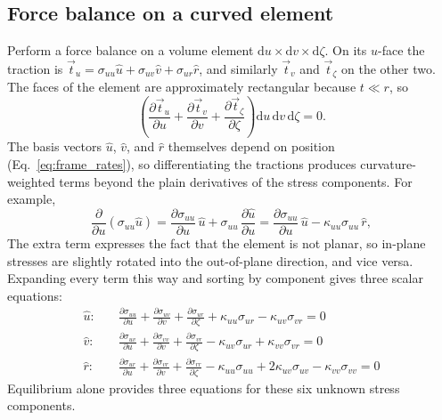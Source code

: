 \documentclass[11pt]{article}
\begin{document}
\subsection{Force balance on a curved element}\label{sec:force_balance}
Perform a force balance on a volume element
$\mathrm du \times \mathrm dv \times \mathrm d\zeta$. On its $u$-face the
traction is $\vec t_u = \sigma_{uu}\hat u + \sigma_{uv}\hat v
+ \sigma_{ur}\hat r$, and similarly $\vec t_v$ and $\vec t_\zeta$ on the other
two. The faces of the element are approximately rectangular because $t \ll r$, so
\begin{equation}\label{eq:net_force}
    \left(\frac{\partial \vec t_u}{\partial u}
      + \frac{\partial \vec t_v}{\partial v}
      + \frac{\partial \vec t_\zeta}{\partial \zeta}\right)
    \mathrm du\,\mathrm dv\,\mathrm d\zeta = 0.
\end{equation}
The basis vectors $\hat u$, $\hat v$, and $\hat r$ themselves depend on position (Eq.~\ref{eq:frame_rates}), so
differentiating the tractions produces curvature-weighted terms beyond the plain
derivatives of the stress components. For example,
\begin{equation}\label{eq:example_term}
    \frac{\partial}{\partial u}\left(\sigma_{uu}\hat u\right)
    = \frac{\partial \sigma_{uu}}{\partial u}\,\hat u
      + \sigma_{uu}\,\frac{\partial \hat u}{\partial u}
    = \frac{\partial \sigma_{uu}}{\partial u}\,\hat u
      - \kappa_{uu}\sigma_{uu}\,\hat r,
\end{equation}
The extra term expresses the fact that the element is not planar, so in-plane stresses are slightly rotated into the out-of-plane direction, and vice versa.  Expanding every term this way and sorting by component gives three scalar equations:
\begin{align}
    \hat u: \quad &\boxed{\frac{\partial \sigma_{uu}}{\partial u}
      + \frac{\partial \sigma_{uv}}{\partial v}
      + \frac{\partial \sigma_{ur}}{\partial \zeta}
      + \kappa_{uu}\sigma_{ur} - \kappa_{uv}\sigma_{vr} = 0}
      \label{eq:eq_u}\\
    \hat v: \quad &\boxed{\frac{\partial \sigma_{uv}}{\partial u}
      + \frac{\partial \sigma_{vv}}{\partial v}
      + \frac{\partial \sigma_{vr}}{\partial \zeta}
      - \kappa_{uv}\sigma_{ur} + \kappa_{vv}\sigma_{vr} = 0}
      \label{eq:eq_v}\\
    \hat r: \quad &\boxed{\frac{\partial \sigma_{ur}}{\partial u}
      + \frac{\partial \sigma_{vr}}{\partial v}
      + \frac{\partial \sigma_{rr}}{\partial \zeta}
      - \kappa_{uu}\sigma_{uu} + 2\kappa_{uv}\sigma_{uv}
      - \kappa_{vv}\sigma_{vv} = 0}
      \label{eq:eq_r}
\end{align}
Equilibrium alone provides three equations for these six unknown stress components. 
\end{document}
